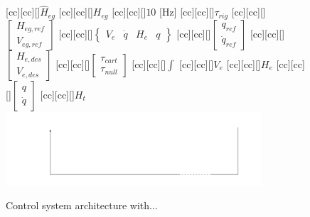 \begin{figure}
[cc][cc][\FontFigS]{\small{$\hat{H}_{eg}$}}
[cc][cc][\FontFigS]{\small{$H_{eg}$}}
[cc][cc][\FontFigS]{\small{$10$ [Hz]}}
[cc][cc][\FontFigS]{\small{$\tau_{rig}$}}
[cc][cc][\FontFigS]{\small{$\begin{bmatrix}H_{eg,ref}\\ V_{eg,ref}\end{bmatrix}$}}
[cc][cc][\FontFigS]{\small{$\begin{Bmatrix}V_{e} & \dot{q} & H_{e} & q\end{Bmatrix}$}}
[cc][cc][\FontFigS]{\small{$\begin{bmatrix}q_{ref}\\ \dot{q}_{ref}\end{bmatrix}$}}
[cc][cc][\FontFigS]{\small{$\begin{bmatrix}H_{e,des}\\ V_{e,des}\end{bmatrix}$}}
[cc][cc][\FontFigS]{\small{$\begin{bmatrix}\tau_{cart}\\ \tau_{null}\end{bmatrix}$}}
[cc][cc][\FontFigS]{$\int$}
[cc][cc][\FontFigS]{\small{$V_e$}}
[cc][cc][\FontFigS]{\small{$H_e$}}
[cc][cc][\FontFigS]{\small{$\begin{bmatrix}q\\ \dot{q}\end{bmatrix}$}}
[cc][cc][\FontFigS]{\small{$H_t$}}
\centering\includegraphics[angle=0,width=0.85\textwidth]{./figures/BlockDia1}
\caption{Control system architecture with...}
\label{fig:blockdiagram}
\end{figure}
%
%
